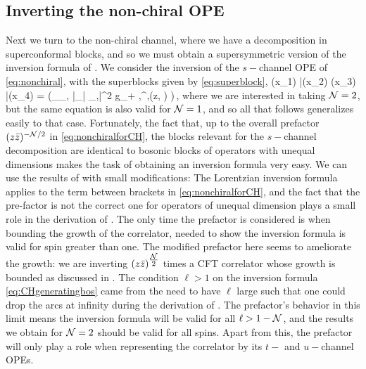 \subsection{Inverting the non-chiral OPE}
\label{sec:nonchiral_inv}

Next we turn to the non-chiral channel, where we have a decomposition in superconformal blocks, and so we must obtain a supersymmetric version of the inversion formula of \cite{Caron-Huot:2017vep}.
We consider the inversion of the $s-$channel OPE of \eqref{eq:nonchiral}, with the superblocks given by \eqref{eq:superblock},
\be 
\langle \phi(x_1) \bar{\phi}(x_2)  \phi(x_3) \bar{\phi}(x_4) \rangle =  \left(\sum\limits_{\OO_{\Delta,\ell}} |\lambda_{\phi \bar{\phi} \OO_{\Delta,\ell}}|^2 g_{\Delta+ \NN,\ell}^{\NN,\NN}(z, \zb) \right)\,,
\label{eq:nonchiralforCH}
\ee 
where we are interested in taking ${\mathcal{N}}=2$, but the same equation is also valid for ${\mathcal{N}}=1$, and so all that follows generalizes easily to that case. Fortunately, the fact that, up to the overall prefactor $(z {\bar{z}})^{-{\mathcal{N}}/2}$ in \eqref{eq:nonchiralforCH}, the blocks relevant for the $s-$channel decomposition are identical to bosonic blocks of operators with unequal dimensions makes the task of obtaining an inversion formula very easy.
We can use the results of \cite{Caron-Huot:2017vep} with small modifications: The Lorentzian inversion formula applies to the term between brackets in \eqref{eq:nonchiralforCH}, and the fact that the pre-factor is not the correct one for operators of unequal dimension plays a small role in the derivation of \cite{Caron-Huot:2017vep}. The only time the prefactor is considered is when bounding the growth of the correlator, needed to show the inversion formula is valid for spin greater than one. The modified prefactor here seems to ameliorate the growth: we are inverting $(z {\bar{z}})^{\tfrac{{\mathcal{N}}}{2}}$ times a CFT correlator whose growth is bounded as discussed in \cite{Caron-Huot:2017vep}.
The condition $\ell > 1$ on the inversion formula \eqref{eq:CHgeneratingbos} came from the need to have $\ell$ large such that one could drop the arcs at infinity during the derivation of \cite{Caron-Huot:2017vep}. The prefactor's behavior in this limit means the inversion formula will be valid for all $\ell > 1 - {\mathcal{N}}$, and the results we obtain for ${\mathcal{N}}=2$ should be valid for all spins.
Apart from this, the prefactor will only play a role when representing the correlator by its $t-$ and $u-$channel OPEs.
